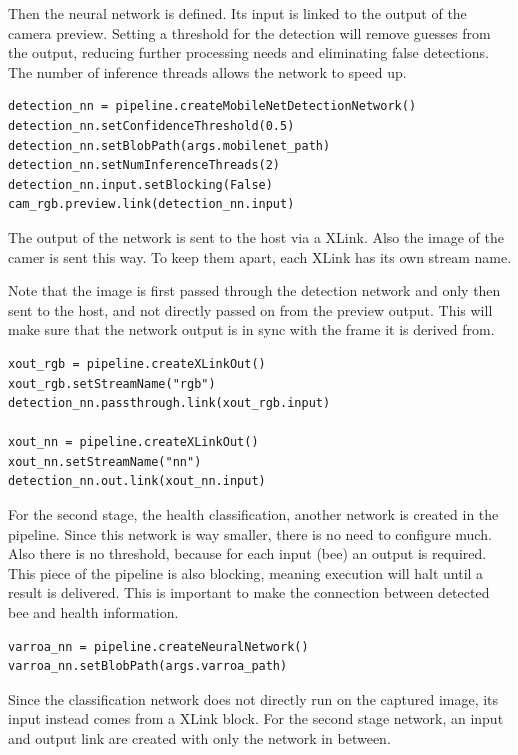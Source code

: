 \documentclass[a4paper,titlepage]{article}
\begin{document}
Then the neural network is defined.
Its input is linked to the output of the camera preview.
Setting a threshold for the detection will remove guesses from the output, reducing further processing needs and eliminating false detections.
The number of inference threads allows the network to speed up.

\begin{lstlisting}
detection_nn = pipeline.createMobileNetDetectionNetwork()
detection_nn.setConfidenceThreshold(0.5)
detection_nn.setBlobPath(args.mobilenet_path)
detection_nn.setNumInferenceThreads(2)
detection_nn.input.setBlocking(False)
cam_rgb.preview.link(detection_nn.input)
\end{lstlisting}

The output of the network is sent to the host via a XLink.
Also the image of the camer is sent this way.
To keep them apart, each XLink has its own stream name.

Note that the image is first passed through the detection network and only then sent to the host, and not directly passed on from the preview output.
This will make sure that the network output is in sync with the frame it is derived from.

\begin{lstlisting}
xout_rgb = pipeline.createXLinkOut()
xout_rgb.setStreamName("rgb")
detection_nn.passthrough.link(xout_rgb.input)

xout_nn = pipeline.createXLinkOut()
xout_nn.setStreamName("nn")
detection_nn.out.link(xout_nn.input)
\end{lstlisting}

\newpage
For the second stage, the health classification, another network is created in the pipeline.
Since this network is way smaller, there is no need to configure much.
Also there is no threshold, because for each input (bee) an output is required.
This piece of the pipeline is also blocking, meaning execution will halt until a result is delivered.
This is important to make the connection between detected bee and health information.

\begin{lstlisting}
varroa_nn = pipeline.createNeuralNetwork()
varroa_nn.setBlobPath(args.varroa_path)
\end{lstlisting}

Since the classification network does not directly run on the captured image, its input instead comes from a XLink block.
For the second stage network, an input and output link are created with only the network in between.
\end{document}
